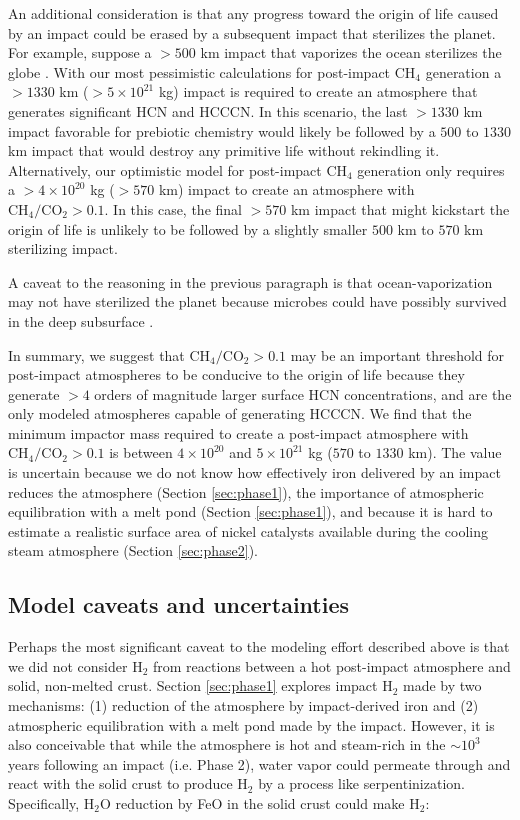 An additional consideration is that any progress toward the origin of life caused by an impact could be erased by a subsequent impact that sterilizes the planet. For example, suppose a $> 500$ km impact that vaporizes the ocean sterilizes the globe \citep{Citron_2022}. With our most pessimistic calculations for post-impact CH$_4$ generation a $> 1330$ km ($> 5 \times 10^{21}$ kg) impact is required to create an atmosphere that generates significant HCN and HCCCN. In this scenario, the last $> 1330$ km impact favorable for prebiotic chemistry would likely be followed by a $500$ to $1330$ km impact that would destroy any primitive life without rekindling it. Alternatively, our optimistic model for post-impact CH$_4$ generation only requires a $> 4 \times 10^{20}$ kg ($> 570$ km) impact to create an atmosphere with $\mathrm{CH_4}/\mathrm{CO_2} > 0.1$. In this case, the final $> 570$ km impact that might kickstart the origin of life is unlikely to be followed by a slightly smaller $500$ km to $570$ km sterilizing impact.

A caveat to the reasoning in the previous paragraph is that ocean-vaporization may not have sterilized the planet because microbes could have possibly survived in the deep subsurface \citep{Sleep_1989,Grimm_2018}. 

In summary, we suggest that $\mathrm{CH_4}/\mathrm{CO_2} > 0.1$ may be an important threshold for post-impact atmospheres to be conducive to the origin of life because they generate $> 4$ orders of magnitude larger surface HCN concentrations, and are the only modeled atmospheres capable of generating HCCCN. We find that the minimum impactor mass required to create a post-impact atmosphere with $\mathrm{CH_4}/\mathrm{CO_2} > 0.1$ is between $4 \times 10^{20}$ and $5 \times 10^{21}$ kg  ($570$ to $1330$ km). The value is uncertain because we do not know how effectively iron delivered by an impact reduces the atmosphere (Section \ref{sec:phase1}), the importance of atmospheric equilibration with a melt pond (Section \ref{sec:phase1}), and because it is hard to estimate a realistic surface area of nickel catalysts available during the cooling steam atmosphere (Section \ref{sec:phase2}).

\subsection{Model caveats and uncertainties}

Perhaps the most significant caveat to the modeling effort described above is that we did not consider H$_2$ from reactions between a hot post-impact atmosphere and solid, non-melted crust. Section \ref{sec:phase1} explores impact H$_2$ made by two mechanisms: (1) reduction of the atmosphere by impact-derived iron and (2) atmospheric equilibration with a melt pond made by the impact. However, it is also conceivable that while the atmosphere is hot and  steam-rich in the $\sim 10^3$ years following an impact (i.e. Phase 2), water vapor could permeate through and react with the solid crust to produce H$_2$ by a process like serpentinization. Specifically, H$_2$O reduction by FeO in the solid crust could make H$_2$: 

